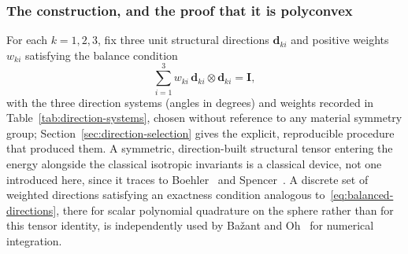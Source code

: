 \documentclass[10pt,a4paper]{article}
\begin{document}
\subsubsection{The construction, and the proof that it is polyconvex}
\label{sec:c5-construction}
For each $k=1,2,3$, fix three unit structural directions $\bm d_{ki}$ and
positive weights $w_{ki}$ satisfying the balance condition
\begin{equation}
 \sum_{i=1}^3w_{ki}\,\bm d_{ki}\otimes \bm d_{ki}=\bm I,
 \label{eq:balanced-directions}
\end{equation}
with the three direction systems (angles in degrees) and weights recorded
in Table~\ref{tab:direction-systems}, chosen without reference to any
material symmetry group; Section~\ref{sec:direction-selection} gives the
explicit, reproducible procedure that produced them. A symmetric,
direction-built structural tensor entering the energy alongside the
classical isotropic invariants is a classical device, not one introduced
here, since it traces to Boehler~\cite{Boehler1987} and
Spencer~\cite{Spencer1971,Spencer1984}. A discrete set of weighted
directions satisfying an exactness condition analogous
to~\eqref{eq:balanced-directions}, there for scalar polynomial quadrature
on the sphere rather than for this tensor identity, is independently used
by Ba\v{z}ant and Oh~\cite{BazantOh1986} for numerical integration.
\end{document}
